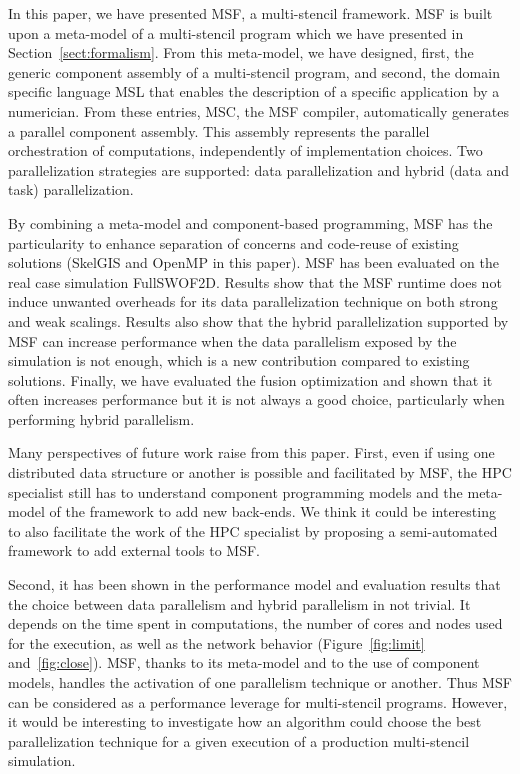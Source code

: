 In this paper, we have presented MSF, a multi-stencil framework.
MSF is built upon a meta-model of a multi-stencil program which we have presented in Section~\ref{sect:formalism}.
From this meta-model, we have designed, first, the generic component assembly of a multi-stencil program, and second, the domain specific language MSL that enables the description of a specific application by a numerician.
From these entries, MSC, the MSF compiler, automatically generates a parallel component assembly.
This assembly represents the parallel orchestration of computations, independently of implementation choices. Two parallelization strategies are supported: data parallelization and hybrid (data and task) parallelization.

By combining a meta-model and component-based programming, MSF has the particularity to enhance separation of concerns and code-reuse of existing solutions (\eg SkelGIS and OpenMP in this paper).
MSF has been evaluated on the real case simulation FullSWOF2D.
Results show that the MSF runtime does not induce unwanted overheads for its data parallelization technique on both strong and weak scalings.
Results also show that the hybrid parallelization supported by MSF can increase performance when the data parallelism exposed by the simulation is not enough, which is a new contribution compared to existing solutions.
Finally, we have evaluated the fusion optimization and shown that it often increases performance but it is not always a good choice, particularly when performing hybrid parallelism.

Many perspectives of future work raise from this paper. First, even if using one distributed data structure or another is possible and facilitated by MSF, the HPC specialist still has to understand component programming models and the meta-model of the framework to add new back-ends. We think it could be interesting to also facilitate the work of the HPC specialist by proposing a semi-automated framework to add external tools to MSF.

Second, it has been shown in the performance model and evaluation results that the choice between data parallelism and hybrid parallelism in not trivial. It depends on the time spent in computations, the number of cores and nodes used for the execution, as well as the network behavior (Figure~\ref{fig:limit} and~\ref{fig:close}). MSF, thanks to its meta-model and to the use of component models, handles the activation of one parallelism technique or another. Thus MSF can be considered as a performance leverage for multi-stencil programs. However, it would be interesting to investigate how an algorithm could choose the best parallelization technique for a given execution of a production multi-stencil simulation.

